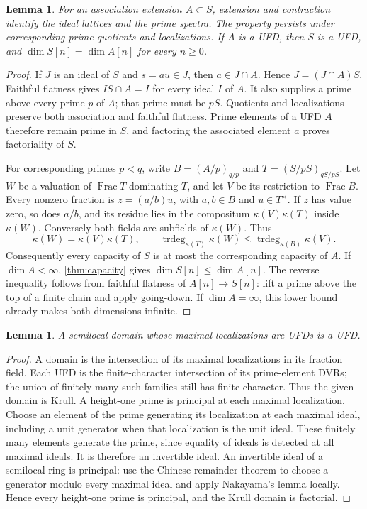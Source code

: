 \documentclass[11pt,reqno]{amsart}
\numberwithin{equation}{section}
\theoremstyle{plain}
\newtheorem{lemma}[theorem]{Lemma}
\theoremstyle{definition}
\theoremstyle{remark}
\begin{document}
\begin{lemma}\label{lem:association}
For an association extension \(A\subset S\), extension and
contraction identify the ideal lattices and the prime spectra.
The property persists under corresponding prime quotients and
localizations. If \(A\) is a UFD, then \(S\) is a UFD, and
\(\dim S[n]=\dim A[n]\) for every \(n\ge0\).
\end{lemma}
\begin{proof}
If \(J\) is an ideal of \(S\) and \(s=au\in J\), then
\(a\in J\cap A\). Hence \(J=(J\cap A)S\). Faithful flatness
gives \(IS\cap A=I\) for every ideal \(I\) of \(A\). It also
supplies a prime above every prime \(p\) of \(A\); that prime
must be \(pS\). Quotients and localizations preserve both
association and faithful flatness. Prime elements of a UFD \(A\)
therefore remain prime in \(S\), and factoring the associated
element \(a\) proves factoriality of \(S\).

For corresponding primes \(p<q\), write
\(B=(A/p)_{q/p}\) and \(T=(S/pS)_{qS/pS}\). Let \(W\)
be a valuation of \(\operatorname{Frac}T\) dominating \(T\),
and let \(V\) be its restriction to \(\operatorname{Frac}B\).
Every nonzero fraction is \(z=(a/b)u\), with \(a,b\in B\)
and \(u\in T^\times\). If \(z\) has value zero, so does
\(a/b\), and its residue lies in the compositum
\(\kappa(V)\kappa(T)\) inside \(\kappa(W)\). Conversely both
fields are subfields of \(\kappa(W)\). Thus
\[
 \kappa(W)=\kappa(V)\kappa(T),\qquad
 \operatorname{trdeg}_{\kappa(T)}\kappa(W)
 \le\operatorname{trdeg}_{\kappa(B)}\kappa(V).
\]
Consequently every capacity of \(S\) is at most the corresponding
capacity of \(A\). If \(\dim A<\infty\), \cref{thm:capacity}
gives \(\dim S[n]\le\dim A[n]\). The reverse inequality
follows from faithful flatness of \(A[n]\to S[n]\): lift a
prime above the top of a finite chain and apply going-down.
If \(\dim A=\infty\), this lower bound already makes both
dimensions infinite.
\end{proof}

\begin{lemma}\label{lem:semilocal-ufd}
A semilocal domain whose maximal localizations are UFDs is a UFD.
\end{lemma}
\begin{proof}
A domain is the intersection of its maximal localizations in its
fraction field. Each UFD is the finite-character intersection of
its prime-element DVRs; the union of finitely many such families
still has finite character. Thus the given domain is Krull.
A height-one prime is principal at each maximal localization.
Choose an element of the prime generating its localization at each
maximal ideal, including a unit generator when that localization
is the unit ideal. These finitely many elements generate the prime,
since equality of ideals is detected at all maximal ideals.
It is therefore an invertible ideal. An invertible ideal of a
semilocal ring is principal: use the Chinese remainder theorem
to choose a generator modulo every maximal ideal and apply
Nakayama's lemma locally. Hence every height-one prime is
principal, and the Krull domain is factorial.
\end{proof}
\end{document}
